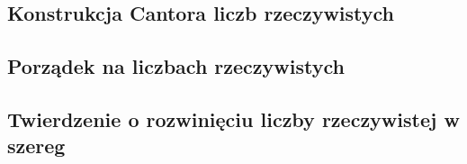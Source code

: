 \subsection{Konstrukcja Cantora liczb rzeczywistych}


\subsection{Porządek na liczbach rzeczywistych}


\subsection{Twierdzenie o rozwinięciu liczby rzeczywistej w szereg}
